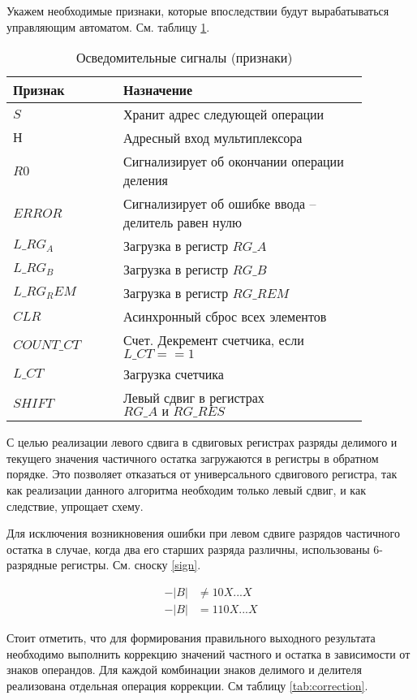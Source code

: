 \documentclass[a4paper,14pt]{extarticle}
\begin{document}
Укажем необходимые признаки, которые впоследствии будут вырабатываться управляющим автоматом. См. таблицу \ref{tab:signals}.
\begin{table}[h!]
	\centering
	\begin{tabular}{|m{0.27\linewidth}|m{0.6\linewidth}|}
		\hline
		\textbf{Признак} & \textbf{Назначение} \\ \hline
		$S$ & Хранит адрес следующей операции \\ \hline
		$Н$ & Адресный вход мультиплексора \\ \hline
		$R0$ & Сигнализирует об окончании операции деления \\ \hline
		$ERROR$ & Сигнализирует об ошибке ввода -- делитель равен нулю \\ \hline
		$L\_RG_A$ & Загрузка в регистр $RG\_A$ \\ \hline
		$L\_RG_B$ & Загрузка в регистр $RG\_B$ \\ \hline
		$L\_RG_REM$ & Загрузка в регистр $RG\_REM$ \\ \hline
		$CLR$ & Асинхронный сброс всех элементов \\ \hline
		$COUNT\_CT$ & Счет. Декремент счетчика, если $L\_CT==1$ \\ \hline
		$L\_CT$ & Загрузка счетчика \\ \hline
		$SHIFT$ & Левый сдвиг в регистрах $RG\_A \text{ и } RG\_RES$ \\ \hline
	\end{tabular}
	\caption{Осведомительные сигналы (признаки)}
	\label{tab:signals}
\end{table}
С целью реализации левого сдвига в сдвиговых регистрах разряды делимого и текущего значения частичного остатка загружаются в регистры в обратном порядке. Это позволяет отказаться от универсального сдвигового регистра, так как реализации данного алгоритма необходим только левый сдвиг, и как следствие, упрощает схему. 

Для исключения возникновения ошибки при левом сдвиге разрядов частичного остатка в случае, когда два его старших разряда различны, использованы 6-разрядные регистры. См. сноску \ref{sign}.

\begin{equation}
\begin{aligned}
\label{sign}
-|B| &\neq 10X...X \\
-|B| &= 110X...X
\end{aligned}
\end{equation}

Стоит отметить, что для формирования правильного выходного результата необходимо выполнить коррекцию значений частного и остатка в зависимости от знаков операндов. Для каждой комбинации знаков делимого и делителя реализована отдельная операция коррекции. См таблицу \ref{tab:correction}.
\end{document}
